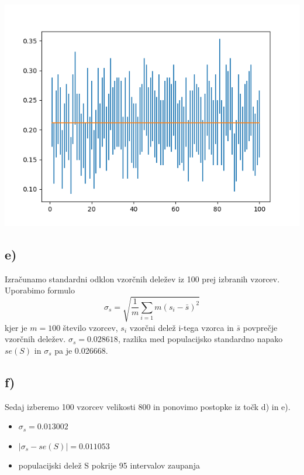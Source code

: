 \documentclass[A4paper, 11pt]{article}
\begin{document}
\includegraphics[scale=0.8]{Kibergrad_1}

\subsection*{e)}
Izračunamo standardni odklon vzorčnih deležev  iz 100 prej izbranih vzorcev. Uporabimo formulo
\[ \sigma_s = \sqrt{\frac{1}{m} \sum_{i=1}{m} (s_i - \bar{s})^2} \] 
kjer je $m=100$ število vzorcev, $s_i$ vzorčni delež i-tega vzorca in $\bar{s}$ povprečje vzorčnih deležev. 
$\sigma_s = 0.028618$, razlika med populacijsko standardno napako $se(S)$ in $\sigma_s$ pa je 0.026668. 

\newpage

\subsection*{f)}
Sedaj izberemo 100 vzorcev velikosti 800 in ponovimo postopke iz točk d) in e).
\begin{itemize}
\item $\sigma_s = 0.013002$
\item $| \sigma_s - se(S) | = 0.011053$
\item populacijski delež S pokrije 95 intervalov zaupanja
\end{itemize}
\end{document}
